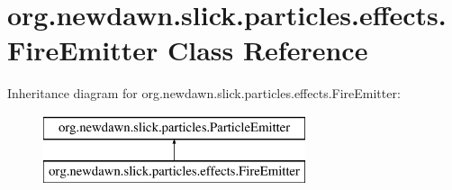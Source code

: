 \hypertarget{classorg_1_1newdawn_1_1slick_1_1particles_1_1effects_1_1_fire_emitter}{}\section{org.\+newdawn.\+slick.\+particles.\+effects.\+Fire\+Emitter Class Reference}
\label{classorg_1_1newdawn_1_1slick_1_1particles_1_1effects_1_1_fire_emitter}
Inheritance diagram for org.\+newdawn.\+slick.\+particles.\+effects.\+Fire\+Emitter\+:\begin{figure}[H]
\begin{center}
\leavevmode
\includegraphics[height=2.000000cm]{classorg_1_1newdawn_1_1slick_1_1particles_1_1effects_1_1_fire_emitter}
\end{center}
\end{figure}
